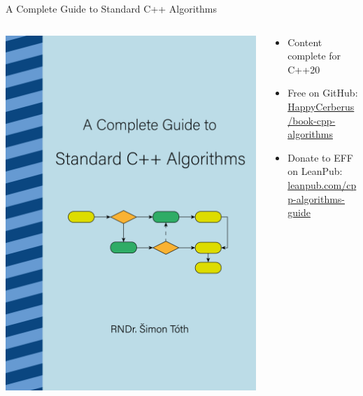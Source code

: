 \documentclass[aspectratio=169]{beamer}
\begin{document}
\begin{frame}{A Complete Guide to Standard C++ Algorithms}
\begin{columns}
    \begin{column}{0.35\textwidth}
        \includegraphics[height=0.8\textheight]{static/book_algorithms.png}
    \end{column}
    \begin{column}{0.6\textwidth}
        \begin{itemize}
            \item Content complete for C++20
            \item Free on GitHub:\\
                \href{https://github.com/HappyCerberus/book-cpp-algorithms}{HappyCerberus/book-cpp-algorithms}
            \item Donate to EFF on LeanPub:\\
                \href{https://leanpub.com/cpp-algorithms-guide}{leanpub.com/cpp-algorithms-guide}
        \end{itemize}
    \end{column}
\end{columns}
\end{frame}
\end{document}
